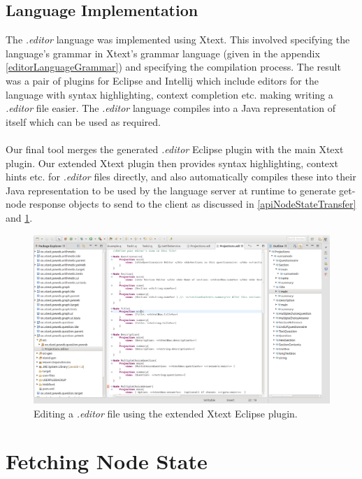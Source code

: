 \documentclass{article}
\begin{document}
{\subsection{Language Implementation}
The \emph{.editor} language was implemented using Xtext. This involved specifying the language's grammar in Xtext's grammar language (given in the appendix \ref{editorLanguageGrammar}) and specifying the compilation process. The result was a pair of plugins for Eclipse and Intellij which include editors for the language with syntax highlighting, context completion etc. making writing a \emph{.editor} file easier. The \emph{.editor} language compiles into a Java representation of itself which can be used as required.
\\
\\
Our final tool merges the generated \emph{.editor} Eclipse plugin with the main Xtext plugin. Our extended Xtext plugin then provides syntax highlighting, context hints etc. for \emph{.editor} files directly, and also automatically compiles these into their Java representation to be used by the language server at runtime to generate get-node response objects to send to the client as discussed in \ref{apiNodeStateTransfer} and \ref{viewObject}.

\begin{figure}[h!]
  \centering
  \includegraphics[width=\linewidth]{./Screenshots/EditorLanguagePluginScreenshot.png}
  \caption{Editing a \emph{.editor} file using the extended Xtext Eclipse plugin.}
  \label{fig:editorEditor}
\end{figure}

\section{Fetching Node State}\label{viewObject}

}
\end{document}

